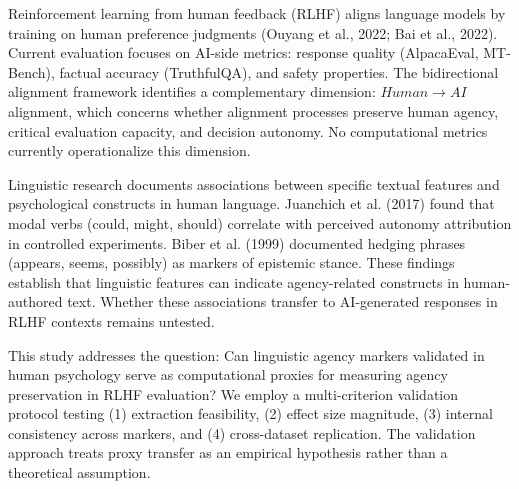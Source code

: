 
Reinforcement learning from human feedback (RLHF) aligns language models by training on human preference judgments (Ouyang et al., 2022; Bai et al., 2022). Current evaluation focuses on AI-side metrics: response quality (AlpacaEval, MT-Bench), factual accuracy (TruthfulQA), and safety properties. The bidirectional alignment framework \citep{shen2024bidirectional} identifies a complementary dimension: $Human\rightarrow AI$ alignment, which concerns whether alignment processes preserve human agency, critical evaluation capacity, and decision autonomy. No computational metrics currently operationalize this dimension.

Linguistic research documents associations between specific textual features and psychological constructs in human language. Juanchich et al. (2017) found that modal verbs (could, might, should) correlate with perceived autonomy attribution in controlled experiments. Biber et al. (1999) documented hedging phrases (appears, seems, possibly) as markers of epistemic stance. These findings establish that linguistic features can indicate agency-related constructs in human-authored text. Whether these associations transfer to AI-generated responses in RLHF contexts remains untested.

This study addresses the question: Can linguistic agency markers validated in human psychology serve as computational proxies for measuring agency preservation in RLHF evaluation? We employ a multi-criterion validation protocol testing (1) extraction feasibility, (2) effect size magnitude, (3) internal consistency across markers, and (4) cross-dataset replication. The validation approach treats proxy transfer as an empirical hypothesis rather than a theoretical assumption.
